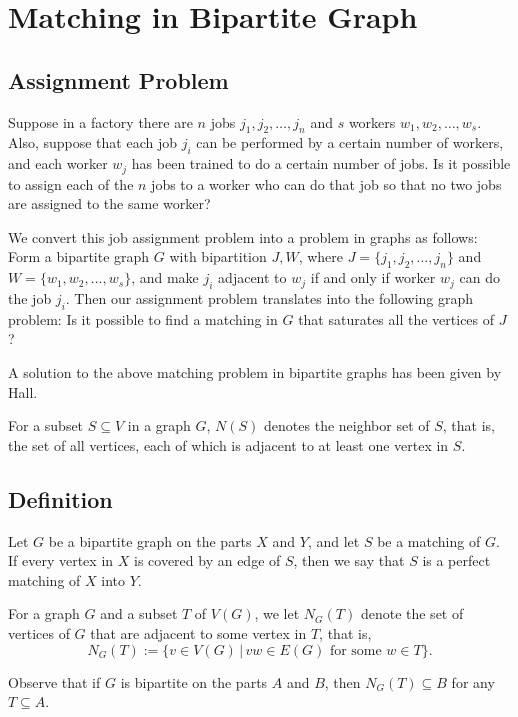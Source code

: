 \documentclass[a4paper,12pt]{report}
\begin{document}
    \section*{Matching in Bipartite Graph}
	
	\subsection*{Assignment Problem}
	Suppose in a factory there are \(n\) jobs \(j_1, j_2, \ldots, j_n\) and \(s\) workers \(w_1, w_2, \ldots, w_s\). Also, suppose that each job \(j_i\) can be performed by a certain number of workers, and each worker \(w_j\) has been trained to do a certain number of jobs. Is it possible to assign each of the \(n\) jobs to a worker who can do that job so that no two jobs are assigned to the same worker?
	
	We convert this job assignment problem into a problem in graphs as follows: Form a bipartite graph \(G\) with bipartition \(J, W\), where \(J = \{j_1, j_2, \ldots, j_n\}\) and \(W = \{w_1, w_2, \ldots, w_s\}\), and make \(j_i\) adjacent to \(w_j\) if and only if worker \(w_j\) can do the job \(j_i\). Then our assignment problem translates into the following graph problem: Is it possible to find a matching in \(G\) that saturates all the vertices of \(J\)?
	
	A solution to the above matching problem in bipartite graphs has been given by Hall.
	
	For a subset \(S \subseteq V\) in a graph \(G\), \(N(S)\) denotes the neighbor set of \(S\), that is, the set of all vertices, each of which is adjacent to at least one vertex in \(S\).

	
		
		\subsection*{Definition}
		Let $G$ be a bipartite graph on the parts $X$ and $Y$, and let $S$ be a matching of $G$. If every vertex in $X$ is covered by an edge of $S$, then we say that $S$ is a perfect matching of $X$ into $Y$.
		
		For a graph $G$ and a subset $T$ of $V(G)$, we let $N_G(T)$ denote the set of vertices of $G$ that are adjacent to some vertex in $T$, that is,
		\[
		N_G(T) := \{v \in V(G) \,|\, vw \in E(G) \text{ for some } w \in T\}.
		\]
		
		Observe that if $G$ is bipartite on the parts $A$ and $B$, then $N_G(T) \subseteq B$ for any $T \subseteq A$.
		
\end{document}
